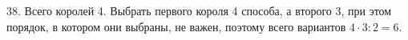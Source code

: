 38. Всего королей 4. Выбрать первого короля 4 способа, а второго 3, при этом порядок, в котором они выбраны, не важен, поэтому всего вариантов $4\cdot3:2=6.$\\
